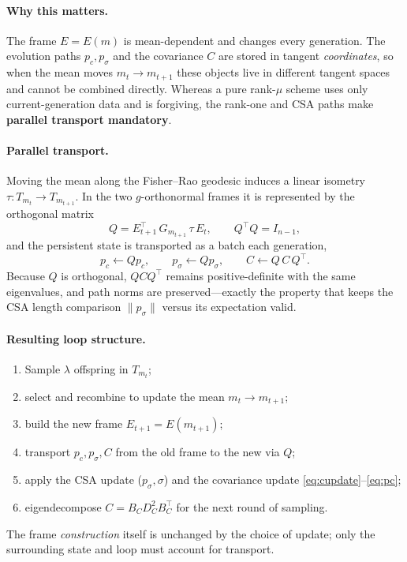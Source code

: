 \documentclass[11pt]{article}
\begin{document}
\paragraph{Why this matters.} The frame $E = E(m)$ is mean-dependent and
changes every generation. The evolution paths $p_c, p_\sigma$ and the
covariance $C$ are stored in tangent \emph{coordinates}, so when the mean moves
$m_t \to m_{t+1}$ these objects live in different tangent spaces and cannot be
combined directly. Whereas a pure rank-$\mu$ scheme uses only current-generation
data and is forgiving, the rank-one and CSA paths make \textbf{parallel
transport mandatory}.

\paragraph{Parallel transport.} Moving the mean along the Fisher--Rao geodesic
induces a linear isometry $\tau : T_{m_t} \to T_{m_{t+1}}$. In the two
$g$-orthonormal frames it is represented by the orthogonal matrix
\begin{equation}
  Q = E_{t+1}^\top\, G_{m_{t+1}}\, \tau\, E_t,
  \qquad Q^\top Q = I_{n-1},
\end{equation}
and the persistent state is transported as a batch each generation,
\begin{equation}
  p_c \leftarrow Q p_c, \qquad
  p_\sigma \leftarrow Q p_\sigma, \qquad
  C \leftarrow Q\, C\, Q^\top.
\end{equation}
Because $Q$ is orthogonal, $Q C Q^\top$ remains positive-definite with the same
eigenvalues, and path norms are preserved---exactly the property that keeps the
CSA length comparison $\|p_\sigma\|$ versus its expectation valid.

\paragraph{Resulting loop structure.}
\begin{enumerate}[label=\arabic*., leftmargin=2em]
  \item Sample $\lambda$ offspring in $T_{m_t}$;
  \item select and recombine to update the mean $m_t \to m_{t+1}$;
  \item build the new frame $E_{t+1} = E(m_{t+1})$;
  \item transport $p_c, p_\sigma, C$ from the old frame to the new via $Q$;
  \item apply the CSA update ($p_\sigma, \sigma$) and the covariance update
        \eqref{eq:cupdate}--\eqref{eq:pc};
  \item eigendecompose $C = B_C D_C^2 B_C^\top$ for the next round of sampling.
\end{enumerate}
The frame \emph{construction} itself is unchanged by the choice of update; only
the surrounding state and loop must account for transport.
\end{document}
